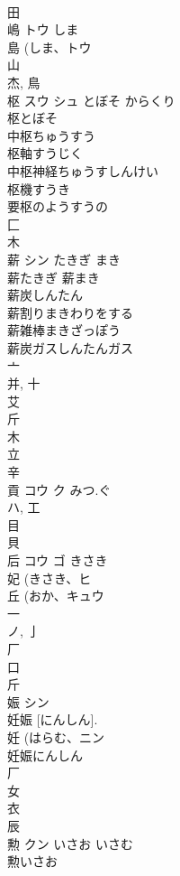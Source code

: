 \documentclass[8pt]{extreport}
\begin{document}
\begin{CJK}{UTF8}{min}
\\	田 
\\	嶋	トウ	しま	
\\	島 (しま、トウ 
\\	山 
\\	杰, 鳥 
\\	枢	スウ シュ	とぼそ からくり	
\\	枢とぼそ
\\	中枢ちゅうすう
\\	枢軸すうじく
\\	中枢神経ちゅうすしんけい
\\	枢機すうき
\\	要枢のようすうの
\\	匚 
\\	木 
\\	薪	シン	たきぎ まき	
\\	薪たきぎ 薪まき 
\\	薪炭しんたん 
\\	薪割りまきわりをする 
\\	薪雑棒まきざっぽう 
\\	薪炭ガスしんたんガス 
\\	亠 
\\	并, 十 
\\	艾 
\\	斤 
\\	木 
\\	立 
\\	辛 
\\	貢	コウ ク	みつ.ぐ	
\\	ハ, 工 
\\	目 
\\	貝 
\\	后	コウ ゴ	きさき	
\\	妃 (きさき、ヒ 
\\	丘 (おか、キュウ 
\\	一 
\\	ノ, 亅 
\\	厂 
\\	口 
\\	斤 
\\	娠	シン		
\\	妊娠 [にんしん]. 
\\	妊 (はらむ、ニン 
\\	妊娠にんしん
\\	厂 
\\	女 
\\	衣 
\\	辰 
\\	勲	クン	いさお いさむ	
\\	勲いさお

\end{CJK}
\end{document}
